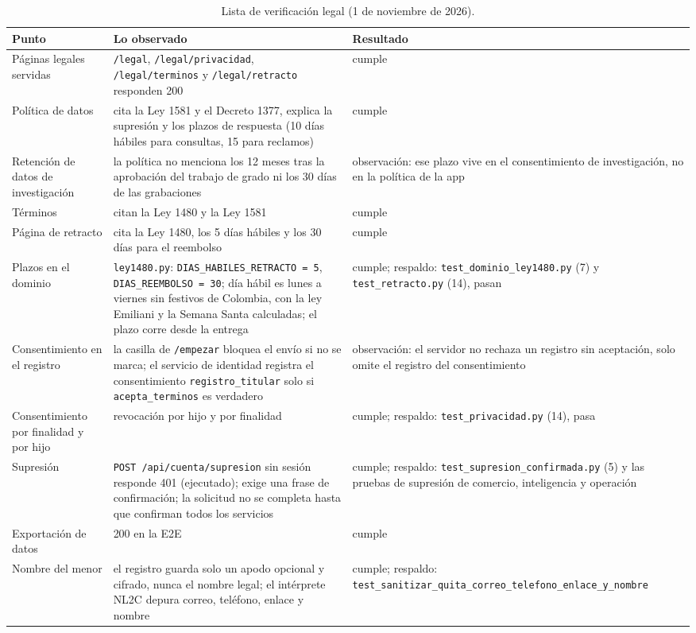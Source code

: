 \documentclass[11pt,letterpaper]{article}
\newcommand{\ruta}[1]{\texttt{\small #1}}
\begin{document}
\begin{longtable}{L{4.2cm}L{6.6cm}L{3.8cm}}
\caption{Lista de verificación legal (1 de noviembre de 2026).}\\
\toprule
Punto & Lo observado & Resultado \\
\midrule\endhead
Páginas legales servidas & \ruta{/\allowbreak{}legal}, \ruta{/\allowbreak{}legal/\allowbreak{}privacidad}, \ruta{/\allowbreak{}legal/\allowbreak{}terminos} y
\ruta{/\allowbreak{}legal/\allowbreak{}retracto} responden 200 & cumple \\
Política de datos & cita la Ley 1581 y el Decreto 1377, explica la supresión y los plazos de respuesta (10
días hábiles para consultas, 15 para reclamos) & cumple \\
Retención de datos de investigación & la política no menciona los 12 meses tras la aprobación del trabajo de
grado ni los 30 días de las grabaciones & observación: ese plazo vive en el consentimiento de investigación,
no en la política de la app \\
Términos & citan la Ley 1480 y la Ley 1581 & cumple \\
Página de retracto & cita la Ley 1480, los 5 días hábiles y los 30 días para el reembolso & cumple \\
Plazos en el dominio & \ruta{ley1480.py}: \ruta{DIAS\_\allowbreak{}HABILES\_\allowbreak{}RETRACTO = 5}, \ruta{DIAS\_\allowbreak{}REEMBOLSO = 30};
día hábil es lunes a viernes sin festivos de Colombia, con la ley Emiliani y la Semana Santa calculadas; el
plazo corre desde la entrega & cumple; respaldo: \ruta{test\_\allowbreak{}dominio\_\allowbreak{}ley1480.py} (7) y
\ruta{test\_\allowbreak{}retracto.py} (14), pasan \\
Consentimiento en el registro & la casilla de \ruta{/\allowbreak{}empezar} bloquea el envío si no se marca; el servicio de
identidad registra el consentimiento \ruta{registro\_\allowbreak{}titular} solo si \ruta{acepta\_\allowbreak{}terminos} es verdadero &
observación: el servidor no rechaza un registro sin aceptación, solo omite el registro del consentimiento \\
Consentimiento por finalidad y por hijo & revocación por hijo y por finalidad & cumple; respaldo:
\ruta{test\_\allowbreak{}privacidad.py} (14), pasa \\
Supresión & \ruta{POST /\allowbreak{}api/\allowbreak{}cuenta/\allowbreak{}supresion} sin sesión responde 401 (ejecutado); exige una frase de
confirmación; la solicitud no se completa hasta que confirman todos los servicios & cumple; respaldo:
\ruta{test\_\allowbreak{}supresion\_\allowbreak{}confirmada.py} (5) y las pruebas de supresión de comercio, inteligencia y operación \\
Exportación de datos & 200 en la E2E & cumple \\
Nombre del menor & el registro guarda solo un apodo opcional y cifrado, nunca el nombre legal; el intérprete
NL2C depura correo, teléfono, enlace y nombre & cumple; respaldo:
\ruta{test\_\allowbreak{}sanitizar\_\allowbreak{}quita\_\allowbreak{}correo\_\allowbreak{}telefono\_\allowbreak{}enlace\_\allowbreak{}y\_\allowbreak{}nombre} \\
\bottomrule
\end{longtable}
\end{document}
